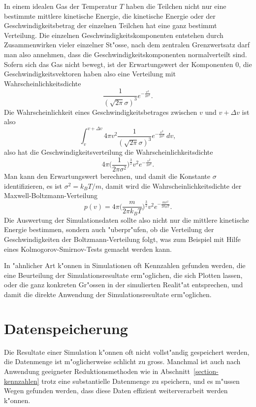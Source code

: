 \begin{beispiel}
In einem idealen Gas der Temperatur $T$ haben die Teilchen nicht nur
eine bestimmte mittlere kinetische Energie, die kinetische Energie
oder der Geschwindigkeitsbetrag
der einzelnen Teilchen hat eine ganz bestimmt Verteilung.
Die einzelnen Geschwindigkeitskomponenten entstehen durch Zusammenwirken
vieler einzelner St"osse, nach dem zentralen Grenzwertsatz darf man also
annehmen, dass die Geschwindigkeitskomponenten normalverteilt sind.
Sofern sich das Gas nicht bewegt, ist der Erwartungswert der Komponenten
0, die Geschwindigkeitsvektoren haben also eine Verteilung mit
Wahrscheinlichkeitsdichte
\[
\frac1{(\sqrt{2\pi}\sigma)^3}e^{-\frac{v^2}{2\sigma^2}}.
\]
Die Wahrscheinlichkeit eines Geschwindigkeitsbetrages zwischen $v$ und
$v+\Delta v$ ist also
\[
\int_v^{v+\Delta v} 4\pi v^2
\frac1{(\sqrt{2\pi}\sigma)^3}e^{-\frac{v^2}{2\sigma^2}}\,dv,
\]
also hat die Geschwindigkeitsverteilung die Wahrscheinlichkeitsdichte
\[
4\pi
\biggl(
\frac{1}{2\pi \sigma^2}
\biggr)^{\frac32}
v^2 e^{-\frac{v^2}{2\sigma^2}}.
\]
Man kann den Erwartungswert berechnen, und damit die Konstante $\sigma$
identifizieren, es ist $\sigma^2=k_BT/m$, damit wird die 
Wahrscheinlichkeitsdichte der Maxwell-Boltzmann-Verteilung
\[
p(v)=
4\pi\biggl(\frac{m}{2\pi k_BT}\biggr)^\frac32 v^2 e^{-\frac{mv^2}{2k_BT}}.
\]
Die Auswertung der Simulationsdaten sollte also nicht nur die mittlere
kinetische Energie bestimmen, sondern auch "uberpr"ufen, ob die Verteilung
der Geschwindigkeiten der Boltzmann-Verteilung folgt, was zum Beispiel mit
Hilfe eines Kolmogorov-Smirnov-Tests gemacht werden kann.
\end{beispiel}

In "ahnlicher Art k"onnen in Simulationen oft Kennzahlen gefunden werden,
die eine Beurteilung der Simulationsresultate erm"oglichen, die sich
Plotten lassen, oder die ganz konkreten Gr"ossen in der simulierten
Realit"at entsprechen, und damit die direkte Anwendung der
Simulationsresultate erm"oglichen.

\section{Datenspeicherung}
Die Resultate einer Simulation k"onnen oft nicht vollst"andig gespeichert
werden, die Datenmenge ist m"oglicherweise schlicht zu gross.
Manchmal ist auch nach Anwendung geeigneter Reduktionsmethoden wie
in Abschnitt~\ref{section-kennzahlen} trotz eine substantielle Datenmenge zu
speichern, und es m"ussen Wegen gefunden werden, dass diese Daten
effizient weiterverarbeit werden k"onnen.

